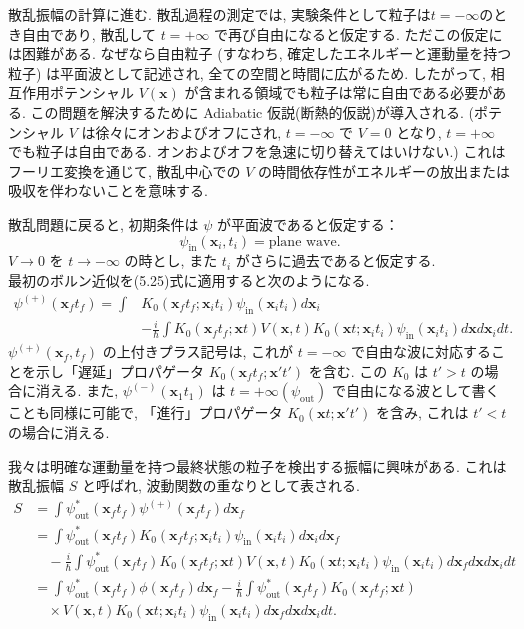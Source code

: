 \documentclass[a4paper,12pt]{article}
\begin{document}
\color{black}
散乱振幅の計算に進む. 散乱過程の測定では, 実験条件として粒子は$t = -\infty$のとき自由であり, 散乱して $t = +\infty$ で再び自由になると仮定する. ただこの仮定には困難がある. なぜなら自由粒子 (すなわち, 確定したエネルギーと運動量を持つ粒子) は平面波として記述され, 全ての空間と時間に広がるため. したがって, 相互作用ポテンシャル $V(\mathbf{x})$ が含まれる領域でも粒子は常に自由である必要がある. この問題を解決するために Adiabatic 仮説(断熱的仮説)が導入される. (ポテンシャル $V$ は徐々にオンおよびオフにされ, $t = -\infty$ で $V = 0$ となり, $t = +\infty$ でも粒子は自由である. オンおよびオフを急速に切り替えてはいけない.) これはフーリエ変換を通じて, 散乱中心での $V$ の時間依存性がエネルギーの放出または吸収を伴わないことを意味する.\par
散乱問題に戻ると, 初期条件は $\psi$ が平面波であると仮定する：
\begin{equation*}
    \psi_{\textrm{in}}(\mathbf{x}_i,t_i) = \textrm{plane wave}.
\end{equation*}
$V \to 0$ を $t \to -\infty$ の時とし, また $t_i$ がさらに過去であると仮定する.\\
最初のボルン近似を(5.25)式に適用すると次のようになる.
\begin{align*}
    \psi^{(+)}(\mathbf{x}_{f} t_{f}) = \int &K_0(\mathbf{x}_f t_f; \mathbf{x}_i t_i) \psi_{\textrm{in}}(\mathbf{x}_i t_i) d\mathbf{x}_i\\
    &- \frac{i}{\hbar} \int K_0(\mathbf{x}_f t_f; \mathbf{x}t)V(\mathbf{x},t)K_0(\mathbf{x}t;\mathbf{x}_i t_i)\psi_{\textrm{in}}(\mathbf{x}_i t_i)d\mathbf{x} d\mathbf{x}_i dt. \tag{5.30}
\end{align*}
$\psi^{(+)}(\mathbf{x}_f,t_f)$ の上付きプラス記号は, これが $t = -\infty$ で自由な波に対応することを示し「遅延」プロパゲータ $K_0(\mathbf{x}_f t_f; \mathbf{x}'t')$ を含む. この $K_0$ は $t' > t$ の場合に消える. また, $\psi^{(-)}(\mathbf{x}_1 t_1)$ は $t = +\infty (\psi_{\textrm{out}})$ で自由になる波として書くことも同様に可能で, 「進行」プロパゲータ $K_0(\mathbf{x} t; \mathbf{x}'t')$ を含み, これは $t' < t$ の場合に消える.\par
我々は明確な運動量を持つ最終状態の粒子を検出する振幅に興味がある. これは散乱振幅 $S$ と呼ばれ, 波動関数の重なりとして表される.
\begin{align*}
    S &= \int \psi_{\textrm{out}}^{*}(\mathbf{x}_f t_f)\psi^{(+)}(\mathbf{x}_f t_f)d\mathbf{x}_f\\
    &= \int \psi_{\textrm{out}}^{*}(\mathbf{x}_f t_f)K_0(\mathbf{x}_f t_f; \mathbf{x}_i t_i)\psi_{\textrm{in}}(\mathbf{x}_i t_i)d\mathbf{x}_i d\mathbf{x}_f\\
    &\quad -\frac{i}{\hbar} \int \psi_{\textrm{out}}^{*}(\mathbf{x}_f t_f)K_0(\mathbf{x}_f t_f; \mathbf{x}t)V(\mathbf{x},t)K_0(\mathbf{x}t; \mathbf{x}_i t_i)\psi_{\textrm{in}}(\mathbf{x}_i t_i)d\mathbf{x}_f d\mathbf{x} d\mathbf{x}_i dt\\
    &= \int \psi_{\textrm{out}}^{*}(\mathbf{x}_f t_f)\phi(\mathbf{x}_f t_f)d\mathbf{x}_f -\frac{i}{\hbar} \int \psi_{\textrm{out}}^{*}(\mathbf{x}_f t_f)K_0 (\mathbf{x}_f t_f; \mathbf{x}t)\\
    &\quad \times V(\mathbf{x}, t)K_0 (\mathbf{x} t; \mathbf{x}_i t_i)\psi_{\textrm{in}}(\mathbf{x}_i t_i)d\mathbf{x}_f d\mathbf{x} d\mathbf{x}_i dt. \tag{5.31}
\end{align*}
\end{document}
